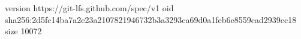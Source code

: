 version https://git-lfs.github.com/spec/v1
oid sha256:2d5fc14ba7a2e23a2107821946732b3a3293ca69d0a1feb6e8559cad2939cc18
size 10072
